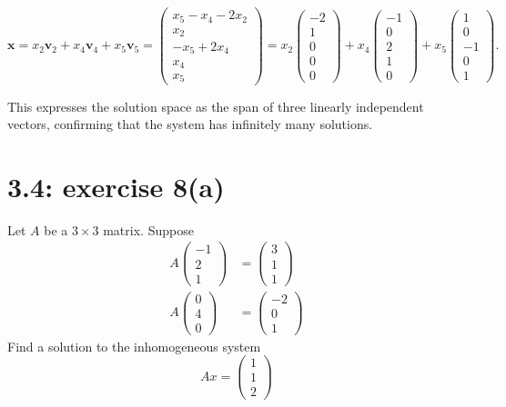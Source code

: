\documentclass{report}
\begin{document}
\begin{enumerate}
\[
\mathbf{x} = x_2 \mathbf{v}_2 + x_4 \mathbf{v}_4 + x_5 \mathbf{v}_5 = \begin{pmatrix} x_5 - x_4 - 2x_2 \\ x_2 \\ -x_5 + 2x_4 \\ x_4 \\ x_5 \end{pmatrix} = x_2 \begin{pmatrix} -2 \\ 1 \\ 0 \\ 0 \\ 0 \end{pmatrix} + x_4 \begin{pmatrix} -1 \\ 0 \\ 2 \\ 1 \\ 0 \end{pmatrix} + x_5 \begin{pmatrix} 1 \\ 0 \\ -1 \\ 0 \\ 1 \end{pmatrix}.
\]

This expresses the solution space as the span of three linearly independent vectors, confirming that the system has infinitely many solutions.

\end{enumerate}




\section*{3.4: exercise 8(a)} 

Let $A$ be a $3\times 3$ matrix.  Suppose 
\begin{align*}
A \begin{pmatrix} -1 \\ 2 \\ 1 \end{pmatrix} &= \begin{pmatrix} 3 \\ 1 \\ 1 \end{pmatrix} \\
A \begin{pmatrix} 0 \\ 4 \\ 0 \end{pmatrix} &= \begin{pmatrix} -2 \\ 0 \\ 1 \end{pmatrix}
\end{align*}
Find a solution to the inhomogeneous system 
\begin{equation*}
Ax = \begin{pmatrix} 1 \\ 1 \\ 2 \end{pmatrix}
\end{equation*}
\end{document}
